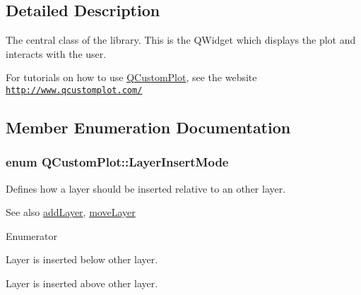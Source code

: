 \subsection{Detailed Description}
The central class of the library. This is the Q\+Widget which displays the plot and interacts with the user. 

For tutorials on how to use \hyperlink{classQCustomPlot}{Q\+Custom\+Plot}, see the website~\newline
\href{http://www.qcustomplot.com/}{\tt http\+://www.\+qcustomplot.\+com/} 

\subsection{Member Enumeration Documentation}
\subsubsection[{\texorpdfstring{Layer\+Insert\+Mode}{LayerInsertMode}}]{\setlength{\rightskip}{0pt plus 5cm}enum {\bf Q\+Custom\+Plot\+::\+Layer\+Insert\+Mode}}\hypertarget{classQCustomPlot_a75a8afbe6ef333b1f3d47abb25b9add7}{}\label{classQCustomPlot_a75a8afbe6ef333b1f3d47abb25b9add7}
Defines how a layer should be inserted relative to an other layer.

\begin{DoxySeeAlso}{See also}
\hyperlink{classQCustomPlot_ad5255393df078448bb6ac83fa5db5f52}{add\+Layer}, \hyperlink{classQCustomPlot_ae896140beff19424e9e9e02d6e331104}{move\+Layer} 
\end{DoxySeeAlso}
\begin{Desc}
\item[Enumerator]\par
\begin{description}
\item[{\em 
lim\+Below\hypertarget{classQCustomPlot_a75a8afbe6ef333b1f3d47abb25b9add7aee39cf650cd24e68552da0b697ce4a93}{}\label{classQCustomPlot_a75a8afbe6ef333b1f3d47abb25b9add7aee39cf650cd24e68552da0b697ce4a93}
}]Layer is inserted below other layer. \item[{\em 
lim\+Above\hypertarget{classQCustomPlot_a75a8afbe6ef333b1f3d47abb25b9add7a062b0b7825650b432a713c0df6742d41}{}\label{classQCustomPlot_a75a8afbe6ef333b1f3d47abb25b9add7a062b0b7825650b432a713c0df6742d41}
}]Layer is inserted above other layer. \end{description}
\end{Desc}
